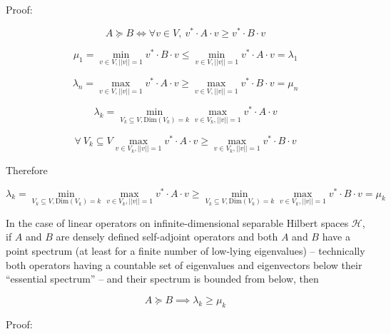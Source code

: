 \documentclass{article}
\theoremstyle{definition}
\begin{document}
Proof:

\begin{equation}
    A \succcurlyeq B
    \iff
    \forall v \in V, \ v^* \cdot A \cdot v \ge v^* \cdot B \cdot v
\end{equation}

\begin{equation}
    \mu_1
    =
    \min_{v \in V, ||v||=1}
    v^* \cdot B \cdot v
    \le
    \min_{v \in V, ||v||=1}
    v^* \cdot A \cdot v
    =
    \lambda_1
\end{equation}

\begin{equation}
    \lambda_n
    =
    \max_{v \in V, ||v||=1}
    v^* \cdot A \cdot v
    \ge
    \max_{v \in V, ||v||=1}
    v^* \cdot B \cdot v
    =
    \mu_n
\end{equation}

\begin{equation}
    \lambda_k
    =
    \min_{V_k \subseteq V, \text{Dim}(V_k)=k} \max_{v\in V_k, ||v||=1} 
    v^* \cdot A \cdot v
\end{equation}

\begin{equation}
    \forall \  V_k\subseteq V  \max_{v\in V_k, ||v||=1} 
    v^* \cdot A \cdot v
    \ge
    \max_{v\in V_k, ||v||=1} 
    v^* \cdot B \cdot v
\end{equation}

Therefore 

\begin{equation}
        \lambda_k
    =
    \min_{V_k \subseteq V, \text{Dim}(V_k)=k} \max_{v\in V_k, ||v||=1} 
    v^* \cdot A \cdot v
    \ge
    \min_{V_k \subseteq V, \text{Dim}(V_k)=k} \max_{v\in V_k, ||v||=1} 
    v^* \cdot B \cdot v
    =
    \mu_k
\end{equation}

In the case of linear operators on infinite-dimensional separable Hilbert spaces $\mathcal{H}$, if $A$ and $B$ are densely defined self-adjoint operators and both $A$ and $B$ have a point spectrum (at least for a finite number of low-lying eigenvalues) -- technically both operators having a countable set of eigenvalues and eigenvectors below their ``essential spectrum'' --  and their spectrum is bounded from below, then

\begin{equation}
    A \succcurlyeq B
    \implies
    \lambda_k \ge \mu_k
\end{equation}

Proof:
\end{document}
